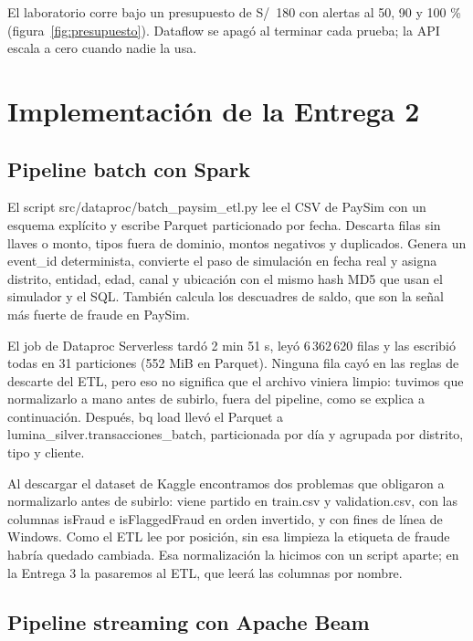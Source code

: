 \documentclass[11pt,a4paper]{article}
\DeclareRobustCommand{\cod}[1]{{\small\ttfamily\codbreaks #1}}
\DeclareRobustCommand{\codbreaks}{\let\oldus\_\renewcommand{\_}{\oldus\allowbreak}}
\begin{document}
El laboratorio corre bajo un presupuesto de S/~180 con alertas al 50, 90 y 100 \% (figura~\ref{fig:presupuesto}). Dataflow se apagó al terminar cada prueba; la API escala a cero cuando nadie la usa.


\section{Implementación de la Entrega 2}

\subsection{Pipeline batch con Spark}

El script \cod{src/dataproc/batch\_paysim\_etl.py} lee el CSV de PaySim con un esquema explícito y escribe Parquet particionado por fecha. Descarta filas sin llaves o monto, tipos fuera de dominio, montos negativos y duplicados. Genera un \cod{event\_id} determinista, convierte el paso de simulación en fecha real y asigna distrito, entidad, edad, canal y ubicación con el mismo hash MD5 que usan el simulador y el SQL. También calcula los descuadres de saldo, que son la señal más fuerte de fraude en PaySim.

El job de Dataproc Serverless tardó 2 min 51 s, leyó 6\,362\,620 filas y las escribió todas en 31 particiones (552 MiB en Parquet). Ninguna fila cayó en las reglas de descarte del ETL, pero eso no significa que el archivo viniera limpio: tuvimos que normalizarlo a mano antes de subirlo, fuera del pipeline, como se explica a continuación. Después, \cod{bq load} llevó el Parquet a \cod{lumina\_silver.transacciones\_batch}, particionada por día y agrupada por distrito, tipo y cliente.

Al descargar el dataset de Kaggle encontramos dos problemas que obligaron a normalizarlo antes de subirlo: viene partido en \cod{train.csv} y \cod{validation.csv}, con las columnas \cod{isFraud} e \cod{isFlaggedFraud} en orden invertido, y con fines de línea de Windows. Como el ETL lee por posición, sin esa limpieza la etiqueta de fraude habría quedado cambiada. Esa normalización la hicimos con un script aparte; en la Entrega 3 la pasaremos al ETL, que leerá las columnas por nombre.

\subsection{Pipeline streaming con Apache Beam}
\end{document}
